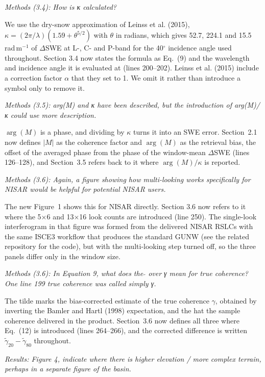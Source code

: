 \documentclass[tc, manuscript]{copernicus}
\begin{document}
\textit{Methods (3.4): How is κ calculated?}

We use the dry-snow approximation of Leinss et al. (2015), $\kappa = (2\pi/\lambda)(1.59 + \theta^{5/2})$ with $\theta$ in radians, which gives 52.7, 224.1 and 15.5\,rad\,m$^{-1}$ of $\Delta$SWE at L-, C- and P-band for the 40$^\circ$ incidence angle used throughout. Section 3.4 now states the formula as Eq.~(9) and the wavelength and incidence angle it is evaluated at (lines 200--202). Leinss et al. (2015) include a correction factor $\alpha$ that they set to 1. We omit it rather than introduce a symbol only to remove it.

\textit{Methods (3.5): arg(M) and κ have been described, but the introduction of arg(M)/κ could use more description.}

$\arg(M)$ is a phase, and dividing by $\kappa$ turns it into an SWE error. Section~2.1 now defines $|M|$ as the coherence factor and $\arg(M)$ as the retrieval bias, the offset of the averaged phase from the phase of the window-mean $\Delta$SWE (lines 126--128), and Section~3.5 refers back to it where $\arg(M)/\kappa$ is reported.

\textit{Methods (3.6): Again, a figure showing how multi-looking works specifically for NISAR would be helpful for potential NISAR users.}

The new Figure~1 shows this for NISAR directly. Section 3.6 now refers to it where the 5$\times$6 and 13$\times$16 look counts are introduced (line 250). The single-look interferogram in that figure was formed from the delivered NISAR RSLCs with the same ISCE3 workflow that produces the standard GUNW (see the related repository for the code), but with the multi-looking step turned off, so the three panels differ only in the window size.

\textit{Methods (3.6): In Equation 9, what does the $\tilde{{}}$ over γ mean for true coherence? One line 199 true coherence was called simply γ.}

The tilde marks the bias-corrected estimate of the true coherence $\gamma$, obtained by inverting the Bamler and Hartl (1998) expectation, and the hat the sample coherence delivered in the product. Section~3.6 now defines all three where Eq.~(12) is introduced (lines 264--266), and the corrected difference is written $\tilde{\gamma}_{20}-\tilde{\gamma}_{80}$ throughout.

\textit{Results: Figure 4, indicate where there is higher elevation / more complex terrain, perhaps in a separate figure of the basin.}
\end{document}
